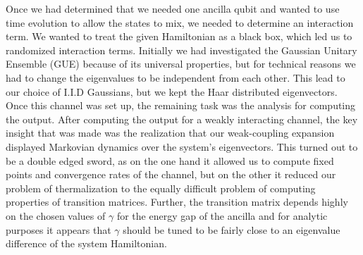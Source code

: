 \documentclass{article}
\begin{document}
Once we had determined that we needed one ancilla qubit and wanted to use time evolution to allow the states to mix, we needed to determine an interaction term. We wanted to treat the given Hamiltonian as a black box, which led us to randomized interaction terms. Initially we had investigated the Gaussian Unitary Ensemble (GUE) because of its universal properties, but for technical reasons we had to change the eigenvalues to be independent from each other. This lead to our choice of I.I.D Gaussians, but we kept the Haar distributed eigenvectors. Once this channel was set up, the remaining task was the analysis for computing the output. After computing the output for a weakly interacting channel, the key insight that was made was the realization that our weak-coupling expansion displayed Markovian dynamics over the system's eigenvectors. This turned out to be a double edged sword, as on the one hand it allowed us to compute fixed points and convergence rates of the channel, but on the other it reduced our problem of thermalization to the equally difficult problem of computing properties of transition matrices. Further, the transition matrix depends highly on the chosen values of $\gamma$ for the energy gap of the ancilla and for analytic purposes it appears that $\gamma$ should be tuned to be fairly close to an eigenvalue difference of the system Hamiltonian. 
\end{document}
